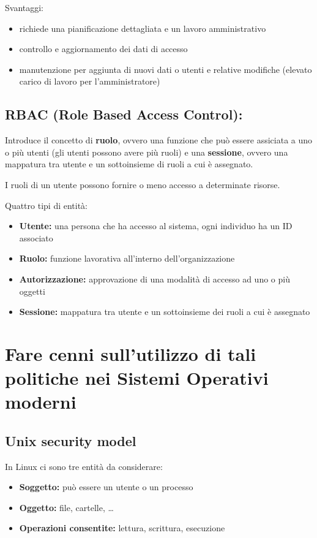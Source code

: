 \documentclass{report}
\begin{document}
\noindent Svantaggi:
\begin{itemize}
    \item richiede una pianificazione dettagliata e un lavoro amministrativo
    \item controllo e aggiornamento dei dati di accesso
    \item manutenzione per aggiunta di nuovi dati o utenti e relative modifiche (elevato carico di lavoro per l'amministratore)
\end{itemize}

\subsection{RBAC (Role Based Access Control):}
\noindent Introduce il concetto di \textbf{ruolo}, ovvero una funzione che può essere assiciata a uno o più utenti (gli utenti possono avere più ruoli)
e una \textbf{sessione}, ovvero una mappatura tra utente e un sottoinsieme di ruoli a cui è assegnato.

\noindent I ruoli di un utente possono fornire o meno accesso a determinate risorse.

\noindent Quattro tipi di entità:
\begin{itemize}
    \item \textbf{Utente:} una persona che ha accesso al sistema, ogni individuo ha un ID associato
    \item \textbf{Ruolo:} funzione lavorativa all'interno dell'organizzazione
    \item \textbf{Autorizzazione:} approvazione di una modalità di accesso ad uno o più oggetti
    \item \textbf{Sessione:} mappatura tra utente e un sottoinsieme dei ruoli a cui è assegnato
\end{itemize}

\section{Fare cenni sull'utilizzo di tali politiche nei Sistemi Operativi moderni}
\subsection{Unix security model}
In Linux ci sono tre entità da considerare:
\begin{itemize}
    \item \textbf{Soggetto:} può essere un utente o un processo 
    \item \textbf{Oggetto:} file, cartelle, \dots
    \item \textbf{Operazioni consentite:} lettura, scrittura, esecuzione 
\end{itemize}
\end{document}
